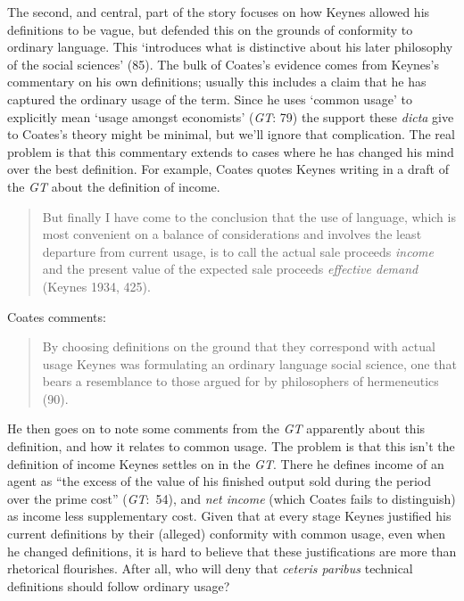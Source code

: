 \documentclass[noflushend]{philosophersimprint}
\begin{document}
The second, and central, part of the story focuses on how Keynes allowed
his definitions to be vague, but defended this on the grounds of
conformity to ordinary language. This `introduces what is distinctive
about his later philosophy of the social sciences' (85). The bulk of
Coates's evidence comes from Keynes's commentary on his own definitions;
usually this includes a claim that he has captured the ordinary usage of
the term. Since he uses `common usage' to explicitly mean `usage amongst
economists' (\emph{GT}: 79) the support these \emph{dicta} give to
Coates's theory might be minimal, but we'll ignore that complication.
The real problem is that this commentary extends to cases where he has
changed his mind over the best definition. For example, Coates quotes
Keynes writing in a draft of the \emph{GT} about the definition of
income.

\begin{quote}
But finally I have come to the conclusion that the use of language,
which is most convenient on a balance of considerations and involves the
least departure from current usage, is to call the actual sale proceeds
\emph{income} and the present value of the expected sale proceeds
\emph{effective demand} (Keynes 1934, 425).
\end{quote}

Coates comments:

\begin{quote}
By choosing definitions on the ground that they correspond with actual
usage Keynes was formulating an ordinary language social science, one
that bears a resemblance to those argued for by philosophers of
hermeneutics (90).
\end{quote}

He then goes on to note some comments from the \emph{GT} apparently
about this definition, and how it relates to common usage. The problem
is that this isn't the definition of income Keynes settles on in the
\emph{GT}. There he defines income of an agent as ``the excess of the
value of his finished output sold during the period over the prime
cost'' (\emph{GT}:~54), and \emph{net income} (which Coates fails to
distinguish) as income less supplementary cost. Given that at every
stage Keynes justified his current definitions by their (alleged)
conformity with common usage, even when he changed definitions, it is
hard to believe that these justifications are more than rhetorical
flourishes. After all, who will deny that \emph{ceteris paribus}
technical definitions should follow ordinary usage?
\end{document}
